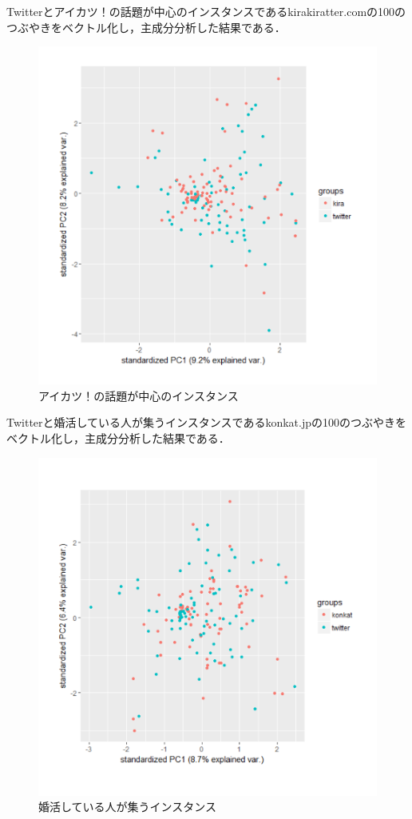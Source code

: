 Twitterとアイカツ！の話題が中心のインスタンスであるkirakiratter.comの100のつぶやきをベクトル化し，主成分分析した結果である．
\begin{figure}[h]
\centering
\includegraphics[width=13cm,clip]{kira.pdf}
\caption{アイカツ！の話題が中心のインスタンス}\label{kira}
\end{figure}
\newpage

Twitterと婚活している人が集うインスタンスであるkonkat.jpの100のつぶやきをベクトル化し，主成分分析した結果である．
\begin{figure}[h]
\centering
\includegraphics[width=13cm,clip]{konkat.pdf}
\caption{婚活している人が集うインスタンス}\label{konkat}
\end{figure}
\newpage

